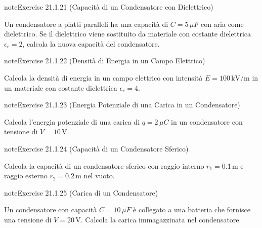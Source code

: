 \documentclass[letterpaper,10pt,italian]{jupyterBook}
\begin{document}
\begin{sphinxadmonition}{note}{Exercise 21.1.21 (Capacità di un Condensatore con Dielettrico)}



\sphinxAtStartPar
Un condensatore a piatti paralleli ha una capacità di \(C = 5 \, \mu F\) con aria come dielettrico. Se il dielettrico viene sostituito da materiale con costante dielettrica \(\epsilon_r = 2\), calcola la nuova capacità del condensatore.
\end{sphinxadmonition}
 \label{exercise:ch/electromagnetism/electrostatics-problems-exercise-21}

\begin{sphinxadmonition}{note}{Exercise 21.1.22 (Densità di Energia in un Campo Elettrico)}



\sphinxAtStartPar
Calcola la densità di energia in un campo elettrico con intensità \(E = 100 \, \text{kV/m}\) in un materiale con costante dielettrica \(\epsilon_r = 4\).
\end{sphinxadmonition}
 \label{exercise:ch/electromagnetism/electrostatics-problems-exercise-22}

\begin{sphinxadmonition}{note}{Exercise 21.1.23 (Energia Potenziale di una Carica in un Condensatore)}



\sphinxAtStartPar
Calcola l’energia potenziale di una carica di \(q = 2 \, \mu C\) in un condensatore con tensione di \(V = 10 \, \text{V}\).
\end{sphinxadmonition}
 \label{exercise:ch/electromagnetism/electrostatics-problems-exercise-23}

\begin{sphinxadmonition}{note}{Exercise 21.1.24 (Capacità di un Condensatore Sferico)}



\sphinxAtStartPar
Calcola la capacità di un condensatore sferico con raggio interno \(r_1 = 0.1 \, \text{m}\) e raggio esterno \(r_2 = 0.2 \, \text{m}\) nel vuoto.
\end{sphinxadmonition}
 \label{exercise:ch/electromagnetism/electrostatics-problems-exercise-24}

\begin{sphinxadmonition}{note}{Exercise 21.1.25 (Carica di un Condensatore)}



\sphinxAtStartPar
Un condensatore con capacità \(C = 10 \, \mu F\) è collegato a una batteria che fornisce una tensione di \(V = 20 \, \text{V}\). Calcola la carica immagazzinata nel condensatore.
\end{sphinxadmonition}
 \label{exercise:ch/electromagnetism/electrostatics-problems-exercise-25}
\end{document}
